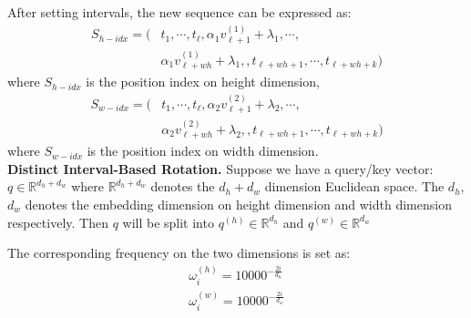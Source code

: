 After setting intervals, the new sequence can be expressed as:
\begin{equation}
    \begin{aligned}
S_{h-idx} = (&t_1, \cdots, t_\ell, \alpha_1v^{(1)}_{\ell+1}+\lambda_1,  \cdots, \\ 
&\alpha_1v^{(1)}_{\ell+wh}+\lambda_1, , t_{\ell+wh+1}, \cdots, t_{\ell+wh+k})
\end{aligned}
\end{equation}
where $S_{h-idx}$ is the position index on height dimension,
\begin{equation}
 \begin{aligned}
S_{w-idx} = (&t_1, \cdots, t_\ell, \alpha_2v^{(2)}_{\ell+1}+\lambda_2,  \cdots, \\ 
&\alpha_2v^{(2)}_{\ell+wh}+\lambda_2, , t_{\ell+wh+1}, \cdots, t_{\ell+wh+k})
\end{aligned}
\end{equation}
where $S_{w-idx}$ is the position index on width dimension.\\
\textbf{Distinct Interval-Based Rotation.}
Suppose we have a query/key vector: $q \in \mathbb{R}^{d_h+d_w}$ where $\mathbb{R}^{d_h+d_w}$ denotes the $d_h+d_w$ dimension Euclidean space. The $d_h$, $d_w$ denotes the embedding dimension on height dimension and width dimension respectively.
Then $q$ will be split into $q^{(h)} \in \mathbb{R}^{d_h}$ and $q^{(w)} \in \mathbb{R}^{d_w}$

The corresponding frequency on the two dimensions is set as: 
\vspace{-2pt}
\begin{equation}
   \begin{aligned}
    \omega_{i}^{(h)}=10000^{-\frac{2i}{d_h}}\\
    \omega_{i}^{(w)}=10000^{-\frac{2i}{d_w}}
\end{aligned} 
\end{equation}

